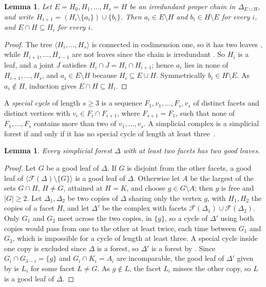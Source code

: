 \documentclass{amsart}
\newtheorem{Lemma}[Theorem]{Lemma}
\theoremstyle{definition}
\theoremstyle{remark}
\begin{document}
\begin{Lemma}\label{lem:chain}
Let $E=H_0,H_1,\ldots,H_s=H$ be an irredundant proper chain in $\Delta_{E\cup H}$, and write $H_{i+1}=(H_i\setminus\{a_i\})\cup\{b_i\}$. Then $a_i\in E\setminus H$ and $b_i\in H\setminus E$ for every $i$, and $E\cap H\subseteq H_i$ for every $i$.
\end{Lemma}
\begin{proof}
The tree $\langle H_i,\ldots,H_s\rangle$ is connected in codimension one, so it has two leaves \cite[Proposition~1.16]{Zheng2004}, while $H_{i+1},\ldots,H_{s-1}$ are not leaves since the chain is irredundant \cite[Lemma~1.10]{Zheng2004}. So $H_i$ is a leaf, and a joint $J$ satisfies $H_i\cap J=H_i\cap H_{i+1}$; hence $a_i$ lies in none of $H_{i+1},\ldots,H_s$, and $a_i\in E\setminus H$ because $H_i\subseteq E\cup H$. Symmetrically $b_i\in H\setminus E$. As $a_i\notin H$, induction gives $E\cap H\subseteq H_i$.
\end{proof}


A {\em special cycle} of length $s\geq3$ is a sequence
$F_1,v_1,\ldots,F_s,v_s$ of distinct facets and distinct vertices with $v_i\in F_i\cap F_{i+1}$, where $F_{s+1}=F_1$, such that none of $F_1,\ldots,F_s$ contains more than two of $v_1,\ldots,v_s$.
A simplicial complex is a simplicial forest if and only if it has no special cycle of length at least three~\cite[Theorem~3.2]{HHTZ}.


\begin{Lemma}\label{lem:two-good-leaves}
Every simplicial forest $\Delta$ with at least two facets has two good leaves.
\end{Lemma}

\begin{proof}
Let $G$ be a good leaf of $\Delta$. If $G$ is disjoint from the other facets, a good leaf of $\langle\mathcal F(\Delta)\setminus\{G\}\rangle$ is a good leaf of $\Delta$. Otherwise let $A$ be the largest of the sets $G\cap H$, $H\neq G$, attained at $H=K$, and choose $g\in G\setminus A$; then $g$ is free and $|G|\geq 2$. Let $\Delta_1,\Delta_2$ be two copies of $\Delta$ sharing only the vertex $g$, with $H_1,H_2$ the copies of a facet $H$, and let $\Delta'$ be the complex with facets $\mathcal F(\Delta_1)\cup\mathcal F(\Delta_2)$. Only $G_1$ and $G_2$ meet across the two copies, in $\{g\}$, so a cycle of $\Delta'$ using both copies would pass from one to the other at least twice, each time between $G_1$ and $G_2$, which is impossible for a cycle of length at least three. A special cycle inside one copy is excluded since $\Delta$ is a forest, so $\Delta'$ is a forest by \cite[Theorem~3.2]{HHTZ}. Since $G_i\cap G_{3-i}=\{g\}$ and $G_i\cap K_i=A_i$ are incomparable, the good leaf of $\Delta'$ given by \cite[Corollary~3.4]{HHTZ} is $L_i$ for some facet $L\neq G$. As $g\notin L$, the facet $L_i$ misses the other copy, so $L$ is a good leaf of $\Delta$.
\end{proof}
\end{document}
